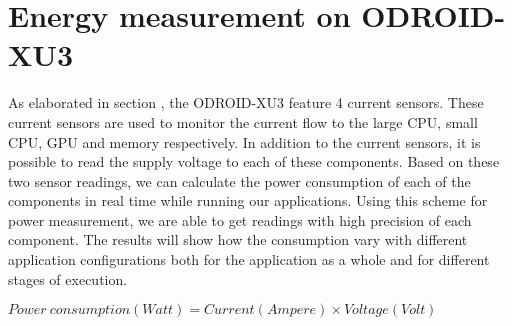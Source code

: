 \section{Energy measurement on ODROID-XU3}
As elaborated in section , the ODROID-XU3 feature 4 current sensors.
These current sensors are used to monitor the current flow to the large CPU, small CPU, GPU and memory respectively.
In addition to the current sensors, it is possible to read the supply voltage to each of these components.
Based on these two sensor readings, we can calculate the power consumption of each of the components in real time while running our applications.
Using this scheme for power measurement, we are able to get readings with high precision of each component.
The results will show how the consumption vary with different application configurations both for the application as a whole and for different stages of execution.

$ Power\ consumption (Watt) = Current (Ampere) \times Voltage (Volt) $

